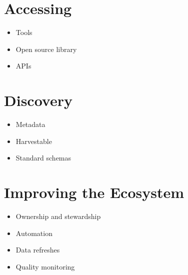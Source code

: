 \documentclass[
  openany]{book}
\providecommand{\tightlist}{%
  \setlength{\itemsep}{0pt}\setlength{\parskip}{0pt}}
\begin{document}
\hypertarget{accessing}{%
\section{Accessing}\label{accessing}}

\begin{itemize}
\tightlist
\item
  Tools
\item
  Open source library
\item
  APIs
\end{itemize}

\hypertarget{discovery}{%
\section{Discovery}\label{discovery}}

\begin{itemize}
\tightlist
\item
  Metadata
\item
  Harvestable
\item
  Standard schemas
\end{itemize}

\hypertarget{improving-the-ecosystem}{%
\section{Improving the Ecosystem}\label{improving-the-ecosystem}}

\begin{itemize}
\tightlist
\item
  Ownership and stewardship
\item
  Automation
\item
  Data refreshes
\item
  Quality monitoring
\end{itemize}

  
\end{document}
